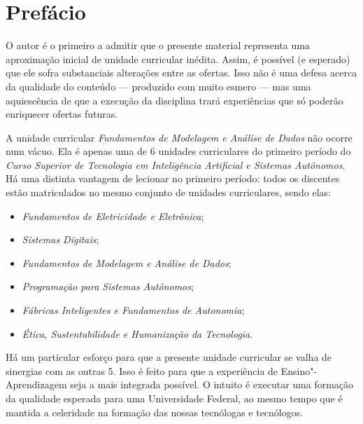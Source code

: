 \chapter{Prefácio}

O autor é o primeiro a admitir que o presente material representa uma aproximação inicial de unidade curricular inédita. Assim, é possível (e esperado) que ele sofra substanciais alterações entre as ofertas. Isso não é uma defesa acerca da qualidade do conteúdo --- produzido com muito esmero --- mas uma aquiescência de que a execução da disciplina trará experiências que só poderão enriquecer ofertas futuras.

A unidade curricular \emph{Fundamentos de Modelagem e Análise de Dados} não ocorre num vácuo. Ela é apenas uma de 6 unidades curriculares do primeiro período do \emph{Curso Superior de Tecnologia em Inteligência Artificial e Sistemas Autônomos}. Há uma distinta vantagem de lecionar no primeiro período: todos os discentes estão matriculados no mesmo conjunto de unidades curriculares, sendo elas:
\begin{itemize}
	\item \emph{Fundamentos de Eletricidade e Eletrônica};
	\item \emph{Sistemas Digitais};
	\item \emph{Fundamentos de Modelagem e Análise de Dados};
	\item \emph{Programação para Sistemas Autônomos};
	\item \emph{Fábricas Inteligentes e Fundamentos de Autonomia};
	\item \emph{Ética, Sustentabilidade e Humanização da Tecnologia}.
\end{itemize}

Há um particular esforço para que a presente unidade curricular se valha de sinergias com as outras 5. Isso é feito para que a experiência de Ensino"-Aprendizagem seja a mais integrada possível. O intuito é executar uma formação da qualidade esperada para uma Universidade Federal, ao mesmo tempo que é mantida a celeridade na formação das nossas tecnólogas e tecnólogos.

